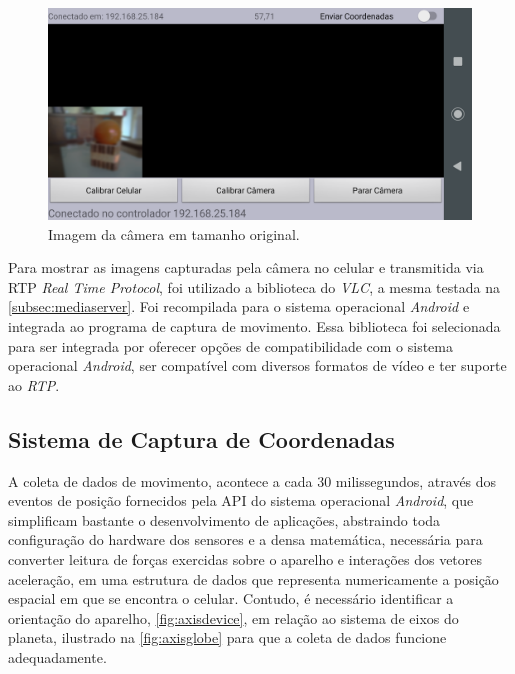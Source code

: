\begin{figure}[H]
	\centering
	\includegraphics[width=1\textwidth]{figuras/modulo_android_2.png}
	\caption{Imagem da câmera em tamanho original.}
	\label{fig:moduloandroid_cam}
\end{figure}

Para mostrar as imagens capturadas pela câmera no celular e transmitida via RTP \textit{Real Time Protocol}, foi utilizado a biblioteca do \textit{VLC}, a mesma testada na \autoref{subsec:mediaserver}. Foi recompilada para o sistema operacional \textit{Android} e integrada ao programa de captura de movimento. Essa biblioteca foi selecionada para ser integrada por oferecer opções de compatibilidade com o sistema operacional \textit{Android}, ser compatível com diversos formatos de vídeo e ter suporte ao \textit{RTP}.\par

\subsection{Sistema de Captura de Coordenadas}
\label{subsec:sistemacapturacoordenadas}

A coleta de dados de movimento, acontece a cada 30 milissegundos, através dos eventos de posição fornecidos pela API do sistema operacional \textit{Android}, que simplificam bastante o desenvolvimento de aplicações, abstraindo toda configuração do hardware dos sensores e a densa matemática, necessária para converter leitura de forças exercidas sobre o aparelho e interações dos vetores aceleração, em uma estrutura de dados que representa numericamente a posição espacial em que se encontra o celular. Contudo, é necessário identificar a orientação do aparelho, \autoref{fig:axisdevice}, em relação ao sistema de eixos do planeta, ilustrado na \autoref{fig:axisglobe} para que a coleta de dados funcione adequadamente.\par

